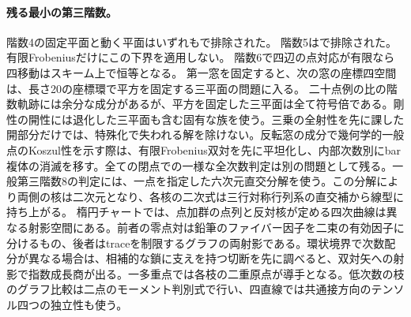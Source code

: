 \documentclass[11pt,a4paper]{ltjsarticle}
\begin{document}
\paragraph{残る最小の第三階数。}
階数4の固定平面と動く平面はいずれもで排除された。
階数5はで排除された。有限Frobeniusだけにこの下界を適用しない。
階数6で四辺の点対応が有限なら四移動はスキーム上で恒等となる。
第一窓を固定すると、次の窓の座標四空間は、長さ20の座標環で平方を固定する三平面の問題に入る。
二十点例の比の階数軌跡には余分な成分があるが、平方を固定した三平面は全て符号倍である。剛性の開性には退化した三平面も含む固有な族を使う。三乗の全射性を先に課した開部分だけでは、特殊化で失われる解を除けない。反転窓の成分で幾何学的一般点のKoszul性を示す際は、有限Frobenius双対を先に平坦化し、内部次数別にbar複体の消滅を移す。全ての閉点での一様な全次数判定は別の問題として残る。一般第三階数8の判定には、一点を指定した六次元直交分解を使う。この分解により両側の核は二次元となり、各核の二次式は三行対称行列系の直交補から線型に持ち上がる。
楕円チャートでは、点加群の点列と反対核が定める四次曲線は異なる射影空間にある。前者の零点対は鉛筆のファイバー因子を二束の有効因子に分けるもの、後者はtraceを制限するグラフの両射影である。環状境界で次数配分が異なる場合は、相補的な鎖に支えを持つ切断を先に調べると、双対矢への射影で指数成長商が出る。一多重点では各枝の二重原点が導手となる。低次数の枝のグラフ比較は二点のモーメント判別式で行い、四直線では共通接方向のテンソル四つの独立性も使う。
\end{document}
